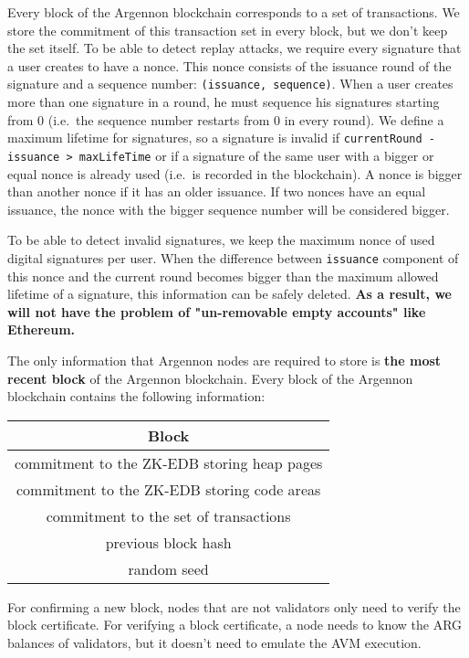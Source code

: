 Every block of the Argennon blockchain corresponds to a set of transactions. We store the commitment of this
transaction set in every block, but we don't keep the set itself. To be able to detect replay attacks, we require
every signature that a user creates to have a nonce. This nonce consists of the issuance round of the signature
and a sequence number: \texttt{(issuance,\ sequence)}. When a user creates more than one signature in a round, he
must sequence his signatures starting from 0 (i.e.~the sequence number restarts from 0 in every round). We define
a maximum lifetime for signatures, so a signature is invalid if \texttt{currentRound - issuance > maxLifeTime} or
if a signature of the same user with a bigger or equal nonce is already used
(i.e.~is recorded in the blockchain). A nonce is bigger than another nonce if it has an older issuance. If two
nonces have an equal issuance, the nonce with the bigger sequence number will be considered bigger.

To be able to detect invalid signatures, we keep the maximum nonce of used digital signatures per user. When the
difference between \texttt{issuance} component of this nonce and the current round becomes bigger than the
maximum allowed lifetime of a signature, this information can be safely deleted. \textbf{As a result, we will not
have the problem of "un-removable empty accounts" like Ethereum.}

The only information that Argennon nodes are required to store is \textbf{the most recent block} of the Argennon
blockchain. Every block of the Argennon blockchain contains the following information:

\begin{center}
    \begin{tabular}{||c||}
        \hline
        Block \\ [0.5ex]
        \hline\hline
        commitment to the ZK-EDB storing heap pages \\ [0.7ex]
        commitment to the ZK-EDB storing code areas \\ [0.7ex]
        commitment to the set of transactions       \\ [0.7ex]
        previous block hash                         \\ [0.7ex]
        random seed                                 \\ [0.7ex]
        \hline
    \end{tabular}
\end{center}

For confirming a new block, nodes that are not validators only need to verify the block certificate. For
verifying a block certificate, a node needs to know the ARG balances of validators, but it doesn't need to
emulate the AVM execution.

